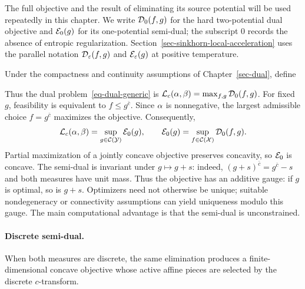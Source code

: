 The full objective and the result of eliminating its source potential will be used repeatedly in this chapter. We write \(\mathcal{D}_0(f,g)\) for the hard two-potential dual objective and \(\mathcal{E}_0(g)\) for its one-potential semi-dual; the subscript \(0\) records the absence of entropic regularization. Section~\ref{sec-sinkhorn-local-acceleration} uses the parallel notation \(\mathcal{D}_\varepsilon(f,g)\) and \(\mathcal{E}_\varepsilon(g)\) at positive temperature.
\begin{defn}\label{def-full-dual-functional}
Under the compactness and continuity assumptions of Chapter~\ref{sec-dual}, define
\end{defn}
Thus the dual problem~\eqref{eq-dual-generic} is $\mathcal{L}_c(\alpha,\beta)=\max_{f,g}\mathcal{D}_0(f,g)$. For fixed $g$, feasibility is equivalent to $f\leq g^{\bar c}$. Since $\alpha$ is nonnegative, the largest admissible choice $f=g^{\bar c}$ maximizes the objective. Consequently,
\[
	\mathcal{L}_c(\alpha,\beta)
	=
	\sup_{g\in\mathcal{C}(\mathcal{Y})}\mathcal{E}_0(g),
	\qquad
	\mathcal{E}_0(g)=\sup_{f\in\mathcal{C}(\mathcal{X})}\mathcal{D}_0(f,g).
\]
Partial maximization of a jointly concave objective preserves concavity, so $\mathcal{E}_0$ is concave. The semi-dual is invariant under $g\mapsto g+s$: indeed, $(g+s)^{\bar c}=g^{\bar c}-s$ and both measures have unit mass. Thus the objective has an additive gauge: if $g$ is optimal, so is $g+s$. Optimizers need not otherwise be unique; suitable nondegeneracy or connectivity assumptions can yield uniqueness modulo this gauge. The main computational advantage is that the semi-dual is unconstrained.

\paragraph{Discrete semi-dual.}
When both measures are discrete, the same elimination produces a finite-dimensional concave objective whose active affine pieces are selected by the discrete $c$-transform.

